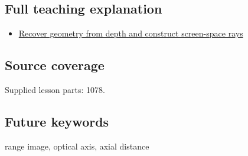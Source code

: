 \subsection{Full teaching explanation}\label{appendix-cac01ebeeb11-full-teaching-explanation}

\begin{itemize}
\tightlist
\item
  \hyperref[02-foundations-ii-ch035-recover-geometry-from-depth-and-construct-screen-space-rays]{Recover geometry from depth and construct screen-space rays}
\end{itemize}

\subsection{Source coverage}\label{appendix-cac01ebeeb11-source-coverage}

Supplied lesson parts: 1078.

\subsection{Future keywords}\label{appendix-cac01ebeeb11-future-keywords}

range image, optical axis, axial distance
